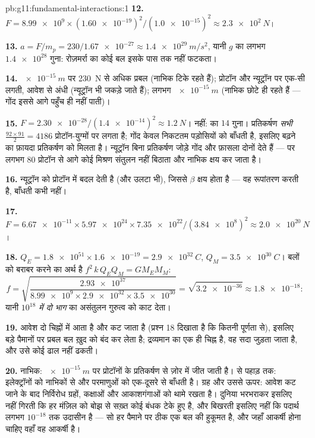 \begin{solution}{pb:g11:fundamental-interactions:1}
\textbf{12.} $F = \num{8.99e9} \times (\num{1.60e-19})^2 /
(\num{1.0e-15})^2 \approx \qty{2.3e2}{N}$।

\textbf{13.} $a = F/m_p = 230/\num{1.67e-27} \approx
\qty{1.4e29}{m/s^2}$, यानी $g$ का लगभग $\num{1.4e28}$ गुना: रोज़मर्रा का कोई
बल इसके पास तक नहीं फटकता।

\textbf{14.} $\qty{e-15}{m}$ पर \qty{230}{N} से अधिक प्रबल (नाभिक टिके रहते हैं);
प्रोटॉन और न्यूट्रॉन पर एक-सी लगती, आवेश से अंधी (न्यूट्रॉन भी जकड़े जाते
हैं);  लगभग $\qty{e-15}{m}$ (नाभिक छोटे ही रहते हैं --- गोंद इससे आगे
पहुँच ही नहीं पाती)।

\textbf{15.} $F = \num{2.30e-28}/(\num{1.4e-14})^2 \approx
\qty{1.2}{N}$। नहीं:  का $14$ गुना। प्रतिकर्षण
\emph{सभी} $\frac{92\times91}{2} = 4186$ प्रोटॉन-युग्मों पर लगता है; गोंद केवल निकटतम पड़ोसियों को
बाँधती है, इसलिए बढ़ने का फ़ायदा प्रतिकर्षण को मिलता है। न्यूट्रॉन बिना
प्रतिकर्षण जोड़े गोंद और फ़ासला दोनों देते हैं --- पर लगभग $80$ प्रोटॉन
से आगे कोई मिश्रण संतुलन नहीं बिठाता और नाभिक क्षय कर जाता है।

\textbf{16.}  न्यूट्रॉन को प्रोटॉन में बदल देती है
(और उलटा भी), जिससे $\beta$ क्षय होता है --- वह रूपांतरण करती है, बाँधती
कभी नहीं।

\textbf{17.} $F = \num{6.67e-11} \times \num{5.97e24} \times
\num{7.35e22}/(\num{3.84e8})^2 \approx \qty{2.0e20}{N}$।

\textbf{18.} $Q_E = \num{1.8e51} \times \num{1.6e-19} =
\qty{2.9e32}{C}$, $Q_M = \qty{3.5e30}{C}$। बलों को बराबर करने का अर्थ है
$f^2\,k\,Q_E Q_M = G M_E M_M$:
\[
f = \sqrt{\frac{\num{2.93e37}}{\num{8.99e9} \times \num{2.9e32}
\times \num{3.5e30}}} = \sqrt{\num{3.2e-36}} \approx \num{1.8e-18} :
\]
यानी \emph{$10^{18}$ में दो भाग} का असंतुलन गुरुत्व को काट देता।

\textbf{19.} आवेश दो चिह्नों में आता है और कट जाता है (प्रश्न 18 दिखाता है
कि कितनी पूर्णता से), इसलिए बड़े पैमानों पर प्रबल बल ख़ुद को बंद कर
लेता है; द्रव्यमान का एक ही चिह्न है, वह सदा जुड़ता जाता है, और उसे कोई ढाल
नहीं ढकती।

\textbf{20.} नाभिक: $\qty{e-15}{m}$ पर  प्रोटॉनों
के प्रतिकर्षण से ज़ोर में जीत जाती है।  से पहाड़ तक:
 इलेक्ट्रॉनों को नाभिकों से और
परमाणुओं को एक-दूसरे से बाँधती है। ग्रह और उससे ऊपर: आवेश कट जाने
के बाद निर्विरोध  ग्रहों, कक्षाओं और
आकाशगंगाओं को थामे रखता है। दुनिया भरभराकर इसलिए नहीं गिरती कि हर मंज़िल को
बोझ से सख़्त कोई बंधक टेके हुए है, और बिखरती इसलिए नहीं कि पदार्थ लगभग
$10^{-18}$ तक उदासीन है --- सो हर पैमाने पर ठीक एक बल की हुकूमत है,
और जहाँ आकर्षी होना चाहिए वहाँ वह आकर्षी है।
\end{solution}
